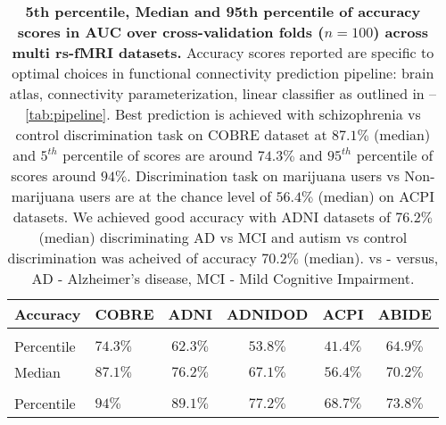 \documentclass[5p]{elsarticle}
\begin{document}
\begin{table}[tb]
\small
\begin{tabularx}{\linewidth}{p{1.2cm}|l|c|c|c|c}
    \rowcolor{gray!50}
    Accuracy & COBRE & ADNI & ADNIDOD & ACPI & ABIDE \\ 
    \hline
    \rowcolor{gray!13}
    {\centering $5^{th}$ \\ Percentile} & $74.3\%$ & $62.3\%$ &
    $53.8\%$ & $41.4\%$ & $64.9\%$\\[.1ex]
    Median& $87.1\%$ & $76.2\%$ & $67.1\%$ & $56.4\%$ & $70.2\%$\\
    \rowcolor{gray!13}%
    {\centering $95^{th}$ \\ Percentile} & $94\%$ & $89.1\%$ &
    $77.2\%$ & $68.7\%$ & $73.8\%$\\
    \hline
\end{tabularx}
    \caption{\textbf{
            5th percentile, Median and 95th percentile of accuracy scores in AUC
            over cross-validation folds ($n=100$) across multi rs-fMRI datasets.}
            Accuracy scores reported are specific to optimal choices in
            functional connectivity prediction pipeline: brain atlas,
            connectivity parameterization, linear classifier as outlined
            in -- \autoref{tab:pipeline}.
            Best prediction is achieved with schizophrenia vs control
            discrimination task on COBRE dataset at $87.1\%$ (median) and
            $5^{th}$ percentile of scores are around $74.3\%$ and $95^{th}$
            percentile of scores around $94\%$. Discrimination task on marijuana
            users vs Non-marijuana users are at the chance level of $56.4\%$
            (median) on ACPI
            datasets. We achieved good accuracy with ADNI datasets of $76.2\%$
            (median) discriminating AD vs MCI and autism vs control
            discrimination was acheived of accuracy $70.2\%$ (median).
            vs - versus, AD - Alzheimer's disease, MCI - Mild Cognitive
            Impairment.}
    \label{tab:scores}
\end{table}

\end{document}
